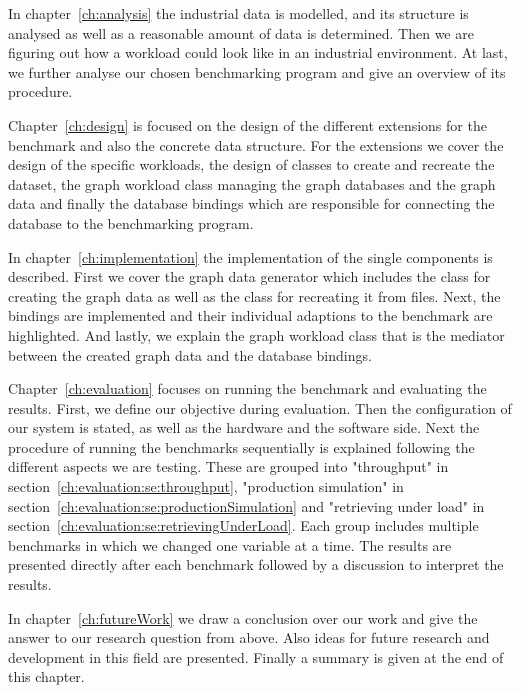 In chapter~\ref{ch:analysis} the industrial data is modelled,
and its structure is analysed as well as a reasonable amount of data is determined.
Then we are figuring out how a workload could look like in an industrial environment.
At last,
we further analyse our chosen benchmarking program and give an overview of its procedure.

Chapter~\ref{ch:design} is focused on the design of the different extensions for the benchmark and also the concrete data structure.
For the extensions we cover the design of the specific workloads,
the design of classes to create and recreate the dataset,
the graph workload class managing the graph databases and the graph data and finally the database bindings which are responsible for connecting the database to the benchmarking program.

In chapter~\ref{ch:implementation} the implementation of the single components is described.
First we cover the graph data generator which includes the class for creating the graph data as well as the class for recreating it from files.
Next,
the bindings are implemented and their individual adaptions to the benchmark are highlighted.
And lastly,
we explain the graph workload class that is the mediator between the created graph data and the database bindings.

Chapter~\ref{ch:evaluation} focuses on running the benchmark and evaluating the results.
First, we define our objective during evaluation.
Then the configuration of our system is stated, as well as the hardware and the software side.
Next the procedure of running the benchmarks sequentially is explained following the different aspects we are testing.
These are grouped into "throughput" in section~\ref{ch:evaluation:se:throughput}, "production simulation" in section~\ref{ch:evaluation:se:productionSimulation} and "retrieving under load" in section~\ref{ch:evaluation:se:retrievingUnderLoad}.
Each group includes multiple benchmarks in which we changed one variable at a time.
The results are presented directly after each benchmark followed by a discussion to interpret the results.

In chapter~\ref{ch:futureWork} we draw a conclusion over our work and give the answer to our research question from above.
Also ideas for future research and development in this field are presented.
Finally a summary is given at the end of this chapter.
